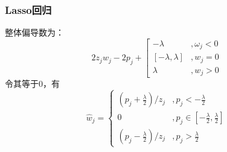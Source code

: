 \documentclass[10pt]{beamer}
\begin{document}
\begin{frame}
	\frametitle{Lasso回归}
	整体偏导数为：
	$$
	2 z_{j} w_{j}-2 p_{j}+\left[\begin{array}{cl}
		-\lambda & , \omega_{j}<0 \\
		{[-\lambda, \lambda]} & , w_{j}=0 \\
		\lambda & , w_{j}>0
	\end{array}\right.
	$$
	令其等于0，有
	$$
	\hat{w}_{j}=\left\{\begin{array}{ll}
	\left(p_{j}+\frac{\lambda}{2}\right) / z_{j} & , p_{j}<-\frac{\lambda}{2} \\
	0 & , p_{j} \in\left[-\frac{\lambda}{2}, \frac{\lambda}{2}\right] \\
	\left(p_{j}-\frac{\lambda}{2}\right) / z_{j} & , p_{j}>\frac{\lambda}{2}
	\end{array}\right.
	$$
	
\end{frame}








\end{document}
